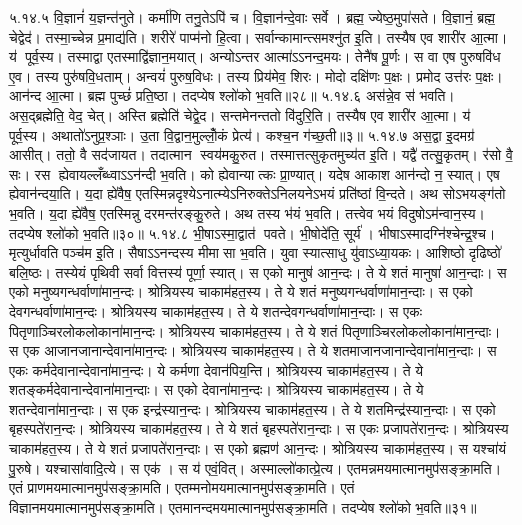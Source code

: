 ५.१४.५
वि॒ज्ञानं॑ य॒ज्ञन्त॑नुते। कर्मा॑णि तनु॒तेऽपि॑ च। वि॒ज्ञान॑न्दे॒वाः सर्वे। ब्रह्म॒ ज्येष्ठ॒मुपा॑सते। वि॒ज्ञानं॒ ब्रह्म॒ चेद्वेद॑। तस्मा॒च्चेन्न प्र॒माद्य॑ति। शरीरे॑ पाप्म॑नो हि॒त्वा। सर्वान्कामान्त्समश्नु॑त इ॒ति। तस्यैष एव शारी॑र आ॒त्मा। य॑ पूर्व॒स्य। तस्माद्वा एतस्माद्वि॑ज्ञान॒मयात्। अन्योऽन्तर आत्मा॑ऽऽनन्द॒मयः। तेनै॑ष पू॒र्णः। स वा एष पुरुषवि॑ध ए॒व। तस्य पुरु॑षवि॒धताम्। अन्वयं॑ पुरुष॒विधः। तस्य प्रिय॑मेव॒ शिरः। मोदो दक्षि॑णः प॒क्षः। प्रमोद उत्त॑रः प॒क्षः। आन॑न्द आ॒त्मा। ब्रह्म पुच्छं॑ प्रति॒ष्ठा। तदप्येष श्लो॑को भ॒वति॥२८॥
५.१४.६
अस॑न्ने॒व स॑ भवति। अस॒द्ब्रह्मेति॒ वेद॒ चेत्। अस्ति ब्रह्मेति॑ चेद्वे॒द। सन्तमेनन्ततो वि॑दुरि॒ति। तस्यैष एव शारी॑र आ॒त्मा। य॑ पूर्व॒स्य। अथातो॑ऽनुप्र॒श्ञाः। उ॒ता वि॒द्वान॒मुल्लोँ॒कं प्रेत्य॑। कश्च॒न ग॑च्छ॒ती॥३॥%
५.१४.७
अस॒द्वा इ॒दमग्र॑ आसीत्। ततो॒ वै सद॑जायत। तदात्मान स्वय॑मकु॒रुत। तस्मात्तत्सुकृतमुच्य॑त इ॒ति। यद्वै॑ तत्सु॒कृतम्। र॑सो वै॒ सः। रस ह्येवायल्लँब्ध्वाऽऽन॑न्दी भ॒वति। को ह्येवान्यात्कः प्रा॒ण्यात्। यदेष आकाश आन॑न्दो न॒ स्यात्। एष ह्येवान॑न्दया॒ति। य॒दा ह्ये॑वैष॒ एतस्मिन्नदृश्येऽनात्म्येऽनिरुक्तेऽनिलयनेऽभयं प्रति॑ष्ठां  वि॒न्दते। अथ सोऽभयङ्ग॑तो भ॒वति। य॒दा ह्ये॑वैष॒ एतस्मिन्नु दरमन्त॑रङ्कु॒रुते। अथ तस्य भ॑यं भ॒वति। तत्त्वेव भयं  विदुषोऽम॑न्वान॒स्य। तदप्येष श्लो॑को भ॒वति॥३०॥
५.१४.८
भी॒षाऽस्मा॒द्वात॑ पवते। भी॒षोदे॑ति॒ सूर्य॑। भीषाऽस्मादग्नि॑श्चेन्द्र॒श्च। मृत्युर्धावति पञ्च॑म इ॒ति। सैषाऽऽनन्दस्य मीमासा भ॒वति। युवा स्यात्साधु यु॑वाऽध्या॒यकः। आशिष्ठो दृढिष्ठो॑ बलि॒ष्ठः। तस्येयं पृथिवी सर्वा वित्तस्य॑ पूर्णा॒ स्यात्। स एको मानुष॑ आन॒न्दः। ते ये शतं मानुषा॑ आन॒न्दाः। स एको मनुष्यगन्धर्वाणा॑मान॒न्दः। श्रोत्रियस्य चाकाम॑हत॒स्य। ते ये शतं मनुष्यगन्धर्वाणा॑मान॒न्दाः। स एको देवगन्धर्वाणा॑मान॒न्दः। श्रोत्रियस्य चाकाम॑हत॒स्य। ते ये शतन्देवगन्धर्वाणा॑मान॒न्दाः। स एकः पितृणाञ्चिरलोकलोकाना॑मान॒न्दः। श्रोत्रियस्य चाकाम॑हत॒स्य। ते ये शतं पितृणाञ्चिरलोकलोकाना॑मान॒न्दाः। स एक आजानजानान्देवाना॑मान॒न्दः। श्रोत्रियस्य चाकाम॑हत॒स्य। ते ये शतमाजानजानान्देवाना॑मान॒न्दाः। स एकः कर्मदेवानान्देवाना॑मान॒न्दः। ये कर्मणा देवान॑पिय॒न्ति। श्रोत्रियस्य चाकाम॑हत॒स्य। ते ये शतङ्कर्मदेवानान्देवाना॑मान॒न्दाः। स एको देवाना॑मान॒न्दः। श्रोत्रियस्य चाकाम॑हत॒स्य। ते ये शतन्देवाना॑मान॒न्दाः। स एक इन्द्र॑स्यान॒न्दः। श्रोत्रियस्य चाकाम॑हत॒स्य। ते ये शतमिन्द्र॑स्यान॒न्दाः। स एको बृहस्पते॑रान॒न्दः। श्रोत्रियस्य चाकाम॑हत॒स्य। ते ये शतं बृहस्पते॑रान॒न्दाः। स एकः प्रजापते॑रान॒न्दः। श्रोत्रियस्य चाकाम॑हत॒स्य। ते ये शतं प्रजापते॑रान॒न्दाः। स एको ब्रह्मण॑ आन॒न्दः। श्रोत्रियस्य चाकाम॑हत॒स्य। स यश्चा॑यं पु॒रुषे। यश्चासा॑वादि॒त्ये। स एक॑। स य॑ एवं॒वित्। अस्माल्लो॑कात्प्रे॒त्य। एतमन्नमयमात्मानमुप॑सङ्क्रा॒मति। एतं प्राणमयमात्मानमुप॑सङ्क्रा॒मति। एतम्मनोमयमात्मानमुप॑सङ्क्रा॒मति। एतं विज्ञानमयमात्मानमुप॑सङ्क्रा॒मति। एतमानन्दमयमात्मानमुप॑सङ्क्रा॒मति। तदप्येष श्लो॑को भ॒वति॥३१॥
